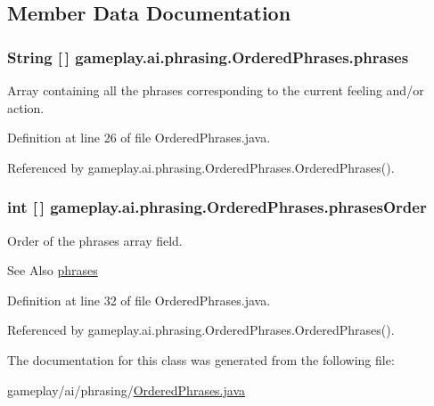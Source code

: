 \subsection{Member Data Documentation}
\hypertarget{classgameplay_1_1ai_1_1phrasing_1_1_ordered_phrases_ad31c26f17c9c223ae5a4260a77e60729}{
\subsubsection[{phrases}]{\setlength{\rightskip}{0pt plus 5cm}String \mbox{[}$\,$\mbox{]} gameplay.\-ai.\-phrasing.\-Ordered\-Phrases.\-phrases\hspace{0.3cm}{\ttfamily [protected]}}}\label{classgameplay_1_1ai_1_1phrasing_1_1_ordered_phrases_ad31c26f17c9c223ae5a4260a77e60729}


Array containing all the phrases corresponding to the current feeling and/or action. 



Definition at line 26 of file Ordered\-Phrases.\-java.



Referenced by gameplay.\-ai.\-phrasing.\-Ordered\-Phrases.\-Ordered\-Phrases().

\hypertarget{classgameplay_1_1ai_1_1phrasing_1_1_ordered_phrases_a8494c96fae41b483dc07c1d513da779e}{
\subsubsection[{phrases\-Order}]{\setlength{\rightskip}{0pt plus 5cm}int \mbox{[}$\,$\mbox{]} gameplay.\-ai.\-phrasing.\-Ordered\-Phrases.\-phrases\-Order\hspace{0.3cm}{\ttfamily [protected]}}}\label{classgameplay_1_1ai_1_1phrasing_1_1_ordered_phrases_a8494c96fae41b483dc07c1d513da779e}


Order of the phrases array field. 

\begin{DoxySeeAlso}{See Also}
\hyperlink{classgameplay_1_1ai_1_1phrasing_1_1_ordered_phrases_ad31c26f17c9c223ae5a4260a77e60729}{phrases} 
\end{DoxySeeAlso}


Definition at line 32 of file Ordered\-Phrases.\-java.



Referenced by gameplay.\-ai.\-phrasing.\-Ordered\-Phrases.\-Ordered\-Phrases().



The documentation for this class was generated from the following file\-:\begin{DoxyCompactItemize}
\item 
gameplay/ai/phrasing/\hyperlink{_ordered_phrases_8java}{Ordered\-Phrases.\-java}\end{DoxyCompactItemize}
